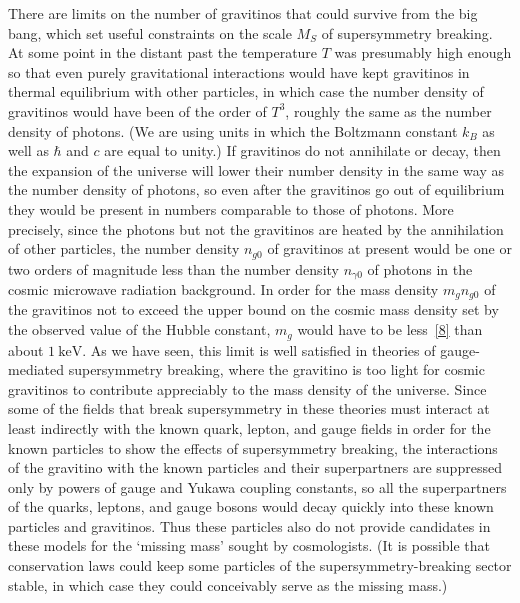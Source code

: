There are limits on the number of gravitinos that could survive from the
big bang, which set useful constraints on the scale \(M_S\) of
supersymmetry breaking. At some point in the distant past the temperature
\(T\) was presumably high enough so that even purely gravitational
interactions would have kept gravitinos in thermal equilibrium with other
particles, in which case the number density of gravitinos would have been
of the order of \(T^3\), roughly the same as the number density of photons.
(We are using units in which the Boltzmann constant \(k_B\) as well as
\(\hbar\) and \(c\) are equal to unity.) If gravitinos do not annihilate or
decay, then the expansion of the universe will lower their number density
in the same way as the number density of photons, so even after the
gravitinos go out of equilibrium they would be present in numbers
comparable to those of photons. More precisely, since the photons but not
the gravitinos are heated by the annihilation of other particles, the
number density \(n_{g0}\) of gravitinos at present would be one or two
orders of magnitude less than the number density \(n_{\gamma0}\) of photons
in the cosmic microwave radiation background. In order for the mass
density \(m_gn_{g0}\) of the gravitinos not to exceed the upper bound on the
cosmic mass density set by the observed value of the Hubble constant,
\(m_g\) would have to be less~\hyperref[ch28-ref-8]{[8]} than about
\(1\ \mathrm{keV}\). As we have seen, this limit is well satisfied in
theories of gauge-mediated supersymmetry breaking, where the gravitino is
too light for cosmic gravitinos to contribute appreciably to the mass
density of the universe. Since some of the fields that break supersymmetry
in these theories must interact at least indirectly with the known quark,
lepton, and gauge fields in order for the known particles to show the
effects of supersymmetry breaking, the interactions of the gravitino with
the known particles and their superpartners are suppressed only by powers
of gauge and Yukawa coupling constants, so all the superpartners of the
quarks, leptons, and gauge bosons would decay quickly into these known
particles and gravitinos. Thus these particles also do not provide
candidates in these models for the `missing mass' sought by cosmologists.
(It is possible that conservation laws could keep some particles of the
supersymmetry-breaking sector stable, in which case they could conceivably
serve as the missing mass.)


